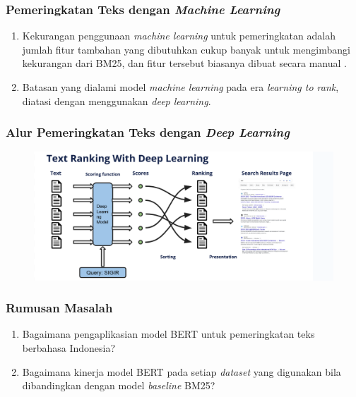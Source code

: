 \documentclass{beamer}
\newcommand{\f}[1]{\textit{#1}}
\begin{document}
\begin{frame}
    \frametitle{Pemeringkatan Teks dengan \f{Machine Learning}}
    \begin{enumerate}
        \item Kekurangan penggunaan \f{machine learning} untuk pemeringkatan adalah jumlah fitur tambahan yang dibutuhkan cukup banyak untuk mengimbangi kekurangan dari BM25, dan fitur tersebut biasanya dibuat secara manual \citep{textrankingsurvey}.
        \item Batasan yang dialami model \f{machine learning} pada era \f{learning to rank}, diatasi dengan menggunakan \f{deep learning}.
    \end{enumerate}

\end{frame}

\begin{frame}
    \frametitle{Alur Pemeringkatan Teks dengan \f{Deep Learning}}
    \begin{figure}
        \centering
        \includegraphics[width=1\textwidth]{assets/pics/DL-IR.png}
    \end{figure}
\end{frame}

\begin{frame}

    
\end{frame}

\begin{frame}
\frametitle{Rumusan Masalah}

\begin{enumerate}
	\item Bagaimana pengaplikasian model BERT untuk pemeringkatan teks berbahasa Indonesia?
	\item Bagaimana kinerja model BERT pada setiap \f{dataset} yang digunakan bila dibandingkan dengan model \f{baseline} BM25?
\end{enumerate}

\end{frame}
\end{document}
